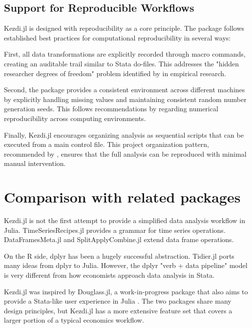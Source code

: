 \documentclass{juliacon}
\begin{document}
\subsection{Support for Reproducible Workflows}

Kezdi.jl is designed with reproducibility as a core principle. The package follows established best practices for computational reproducibility \cite{krafczyk2021learning} in several ways:

First, all data transformations are explicitly recorded through macro commands, creating an auditable trail similar to Stata do-files. This addresses the "hidden researcher degrees of freedom" problem identified by \cite{huntington2021influence} in empirical research.

Second, the package provides a consistent environment across different machines by explicitly handling missing values and maintaining consistent random number generation seeds. This follows recommendations by \cite{mccullough1999numerical} regarding numerical reproducibility across computing environments.

Finally, Kezdi.jl encourages organizing analysis as sequential scripts that can be executed from a main control file. This project organization pattern, recommended by \cite{koren2024ten}, ensures that the full analysis can be reproduced with minimal manual intervention.

\section{Comparison with related packages}

Kezdi.jl is not the first attempt to provide a simplified data analysis workflow in Julia. TimeSeriesRecipes.jl \cite{TimeSeriesRecipes2022} provides a grammar for time series operations. DataFramesMeta.jl \cite{DataFramesMeta2023} and SplitApplyCombine.jl \cite{SplitApplyCombine2023} extend data frame operations.

On the R side, dplyr \cite{dplyr2023} has been a hugely successful abstraction. Tidier.jl \cite{tidier2022} ports many ideas from dplyr to Julia. However, the dplyr "verb + data pipeline" model is very different from how economists approach data analysis in Stata.

Kezdi.jl was inspired by Douglass.jl, a work-in-progress package that also aims to provide a Stata-like user experience in Julia \cite{Douglass.jl2023}. The two packages share many design principles, but Kezdi.jl has a more extensive feature set that covers a larger portion of a typical economics workflow.
\end{document}
